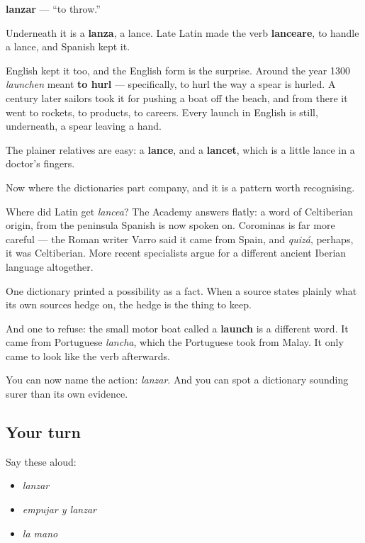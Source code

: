 \begin{cousinweb}
\textbf{lanzar} — \textquotedblleft{}to throw.\textquotedblright{}

Underneath it is a \textbf{lanza}, a lance. Late Latin made the verb \textbf{lanceare}, to handle a lance, and Spanish kept it.

English kept it too, and the English form is the surprise. Around the year 1300 \emph{launchen} meant \textbf{to hurl} — specifically, to hurl the way a spear is hurled. A century later sailors took it for pushing a boat off the beach, and from there it went to rockets, to products, to careers. Every launch in English is still, underneath, a spear leaving a hand.

The plainer relatives are easy: a \textbf{lance}, and a \textbf{lancet}, which is a little lance in a doctor's fingers.

Now where the dictionaries part company, and it is a pattern worth recognising.

Where did Latin get \emph{lancea}? The Academy answers flatly: a word of Celtiberian origin, from the peninsula Spanish is now spoken on. Corominas is far more careful — the Roman writer Varro said it came from Spain, and \emph{quizá}, perhaps, it was Celtiberian. More recent specialists argue for a different ancient Iberian language altogether.

One dictionary printed a possibility as a fact. When a source states plainly what its own sources hedge on, the hedge is the thing to keep.

And one to refuse: the small motor boat called a \textbf{launch} is a different word. It came from Portuguese \emph{lancha}, which the Portuguese took from Malay. It only came to look like the verb afterwards.
\end{cousinweb}

\begin{grammarlens}[title={What you've built}]
You can now name the action: \emph{lanzar}. And you can spot a dictionary sounding surer than its own evidence.
\end{grammarlens}

\subsection*{Your turn}
Say these aloud:

\begin{itemize}
\raggedright
  \item \emph{lanzar}
  \item \emph{empujar y lanzar}
  \item \emph{la mano}
\end{itemize}

